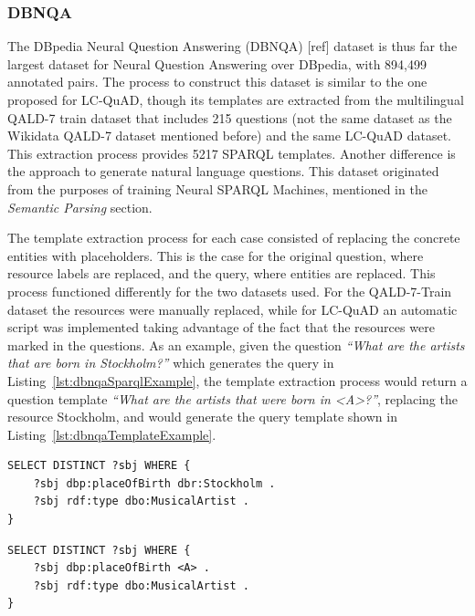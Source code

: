 \subsubsection{DBNQA}
\label{cap2:qakg/benchmarkDatasets/dbnqa}
The DBpedia Neural Question Answering (DBNQA) [ref] dataset is thus far the largest dataset for 
Neural Question Answering over DBpedia, with 894,499 annotated pairs. The process to construct 
this dataset is similar to the one proposed for LC-QuAD, though its templates are extracted 
from the multilingual QALD-7 train dataset that includes 215 questions (not the same dataset as 
the Wikidata QALD-7 dataset mentioned before) and the same LC-QuAD dataset. This extraction 
process provides 5217 SPARQL templates. Another difference is the approach to generate natural 
language questions. This dataset originated from the purposes of training Neural SPARQL 
Machines, mentioned in the \textit{Semantic Parsing} section.

The template extraction process for each case consisted of replacing the concrete entities 
with placeholders. This is the case for the original question, where resource labels are 
replaced, and the query, where entities are replaced. This process functioned differently for 
the two datasets used. For the QALD-7-Train~\cite{dataset:qald7-UsbeckNHKRN17} dataset the 
resources were manually replaced, while for LC-QuAD an automatic script was implemented taking 
advantage of the fact that the resources were marked in the questions. As an example, given the 
question \textit{“What are the artists that are born in Stockholm?”} which generates the query 
in Listing~\ref{lst:dbnqaSparqlExample}, the template extraction process would return a 
question template \textit{“What are the artists that were born in <A>?”}, replacing the 
resource Stockholm, and would generate the query template shown in Listing~\ref{lst:dbnqaTemplateExample}.

\begin{lstlisting}[captionpos=b, 
    caption=SPARQL query for the question: \textit{"What are the artists that are born in Stockholm?"}., 
    label=lst:dbnqaSparqlExample,
    basicstyle=\ttfamily,frame=single]
SELECT DISTINCT ?sbj WHERE {
    ?sbj dbp:placeOfBirth dbr:Stockholm .
    ?sbj rdf:type dbo:MusicalArtist .
}
\end{lstlisting}

\begin{lstlisting}[captionpos=b, 
    caption=Query template for the question: \textit{"What are the artists that are born in <A>?"}., 
    label=lst:dbnqaTemplateExample,
    basicstyle=\ttfamily,frame=single]
SELECT DISTINCT ?sbj WHERE {
    ?sbj dbp:placeOfBirth <A> .
    ?sbj rdf:type dbo:MusicalArtist .
}
\end{lstlisting}

